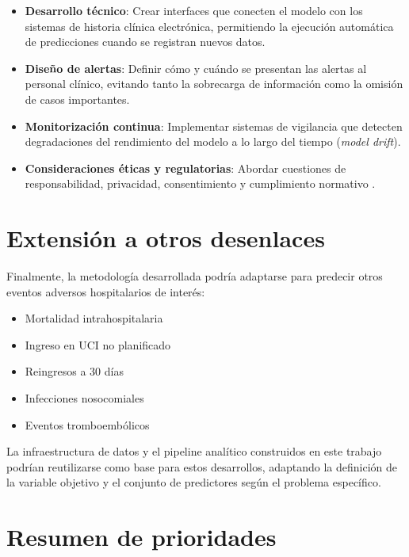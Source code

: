 \documentclass[12pt, a4paper, oneside]{report}
\begin{document}
\begin{itemize}
    \item \textbf{Desarrollo técnico}: Crear interfaces que conecten el modelo con los sistemas de historia clínica electrónica, permitiendo la ejecución automática de predicciones cuando se registran nuevos datos.
    
    \item \textbf{Diseño de alertas}: Definir cómo y cuándo se presentan las alertas al personal clínico, evitando tanto la sobrecarga de información como la omisión de casos importantes.
    
    \item \textbf{Monitorización continua}: Implementar sistemas de vigilancia que detecten degradaciones del rendimiento del modelo a lo largo del tiempo (\textit{model drift}).
    
    \item \textbf{Consideraciones éticas y regulatorias}: Abordar cuestiones de responsabilidad, privacidad, consentimiento y cumplimiento normativo \cite{char2018implementing}.
\end{itemize}

\section{Extensión a otros desenlaces}

Finalmente, la metodología desarrollada podría adaptarse para predecir otros eventos adversos hospitalarios de interés:

\begin{itemize}
    \item Mortalidad intrahospitalaria
    \item Ingreso en UCI no planificado
    \item Reingresos a 30 días
    \item Infecciones nosocomiales
    \item Eventos tromboembólicos
\end{itemize}

La infraestructura de datos y el pipeline analítico construidos en este trabajo podrían reutilizarse como base para estos desarrollos, adaptando la definición de la variable objetivo y el conjunto de predictores según el problema específico.

\section{Resumen de prioridades}
\end{document}
